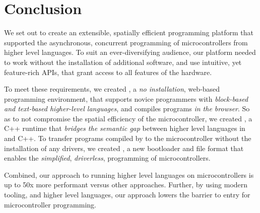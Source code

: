 \section{Conclusion}
\label{sec:conclude}

We set out to create an extensible, spatially efficient programming platform that supported the asynchronous, concurrent programming of microcontrollers from higher level languages. To suit an ever-diversifying audience, our platform needed to work without the installation of additional software, and use intuitive, yet feature-rich APIs, that grant access to all features of the hardware.

To meet these requirements, we created \MCN, a \emph{no installation}, web-based programming environment, that supports novice programmers with \emph{block-based and text-based higher-level languages}, and compiles programs \emph{in the browser}. So as to not compromise the spatial efficiency of the microcontroller, we created \CON, a C++ runtime that \emph{bridges the semantic gap} between higher level languages in \MC and C++. To transfer programs compiled by \MC to the microcontroller without the installation of any drivers, we created \UFN, a new bootloader and file format that enables the \emph{simplified}, \emph{driverless}, programming of microcontrollers.

Combined, our approach to running higher level languages on microcontrollers is up to 50x more performant versus other approaches. Further, by using modern tooling, and higher level languages, our approach lowers the barrier to entry for microcontroller programming.


